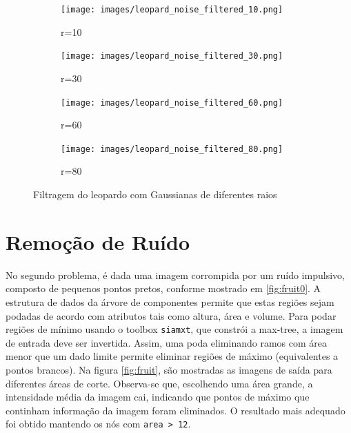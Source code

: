 \documentclass{article}
\begin{document}
\begin{figure}[H]
	\centering
	\begin{subfigure}{.4\textwidth}
		\texttt{[image: images/leopard\_noise\_filtered\_10.png]}
		\caption{r=10}
		\label{fig:leopard1}
	\end{subfigure}
	\begin{subfigure}{.4\textwidth}
		\texttt{[image: images/leopard\_noise\_filtered\_30.png]}
		\caption{r=30}
		\label{fig:leopard1}
	\end{subfigure}
	\begin{subfigure}{.4\textwidth}
		\texttt{[image: images/leopard\_noise\_filtered\_60.png]}
		\caption{r=60}
		\label{fig:leopard1}
	\end{subfigure}
		\begin{subfigure}{.4\textwidth}
		\texttt{[image: images/leopard\_noise\_filtered\_80.png]}
		\caption{r=80}
		\label{fig:leopard1}
	\end{subfigure}
	\caption{Filtragem do leopardo com Gaussianas de diferentes raios}
	\label{fig:leopard}
\end{figure}


\section{Remoção de Ruído}
No segundo problema, é dada uma imagem corrompida por um ruído impulsivo, composto de pequenos pontos pretos, conforme mostrado em \ref{fig:fruit0}. A estrutura de dados da árvore de componentes permite que estas regiões sejam podadas de acordo com atributos tais como altura, área e volume. Para podar regiões de mínimo usando o toolbox \texttt{siamxt}, que constrói a max-tree, a imagem de entrada deve ser invertida. Assim, uma poda eliminando ramos com área menor que um dado limite permite eliminar regiões de máximo (equivalentes a pontos brancos). Na figura \ref{fig:fruit}, são mostradas as imagens de saída para diferentes áreas de corte. Observa-se que, escolhendo uma área grande, a intensidade média da imagem cai, indicando que pontos de máximo que continham informação da imagem foram eliminados. O resultado mais adequado foi obtido mantendo os nós com \texttt{area > 12}.
\end{document}
